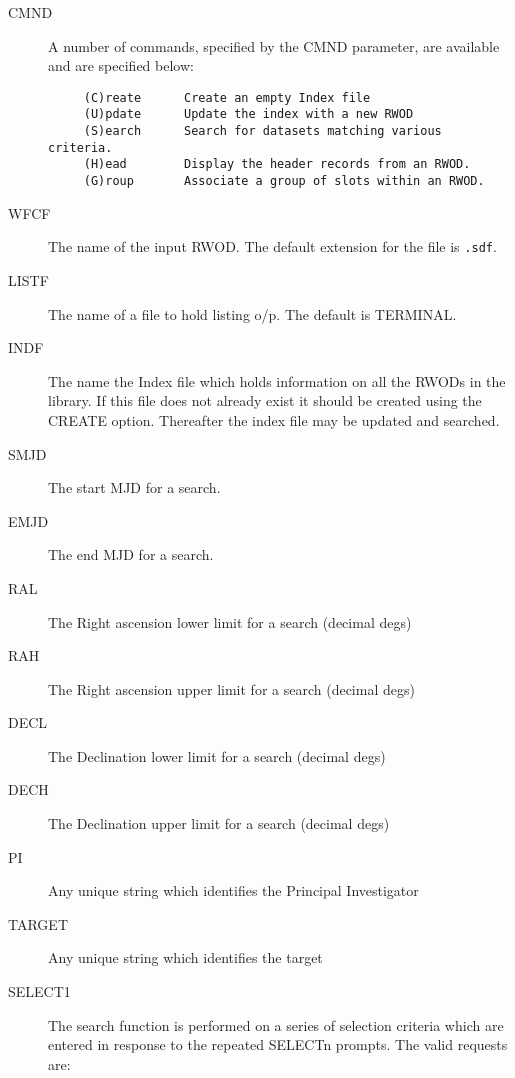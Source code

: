 \begin{description}

\item [CMND] 
A number of commands, specified by the CMND parameter, are
available and are specified below:

\begin{verbatim}
     (C)reate      Create an empty Index file
     (U)pdate      Update the index with a new RWOD
     (S)earch      Search for datasets matching various criteria.
     (H)ead        Display the header records from an RWOD.
     (G)roup       Associate a group of slots within an RWOD.
\end{verbatim}

\item[WFCF   ]
The name of the input RWOD. The default extension for the file is {\tt .sdf}.

\item[LISTF   ]
The name of a file to hold listing o/p. The default is TERMINAL.

\item[INDF   ]
The name the Index file which holds information on all the RWODs
in the library. If this file does not already exist it should be created 
using the CREATE option. Thereafter the index file may be 
updated and searched.

\item[SMJD   ]
The start MJD for a search.

\item[EMJD   ]
The end MJD for a search.

\item[RAL    ]
The Right ascension lower limit for a search (decimal degs)

\item[RAH    ]
The Right ascension upper limit for a search (decimal degs)

\item[DECL   ]
The Declination lower limit for a search (decimal degs)

\item[DECH   ]
The Declination upper limit for a search (decimal degs)

\item[PI   ]
Any unique string which identifies the Principal Investigator

\item[TARGET   ]
Any unique string which identifies the target

\item[SELECT1]
The search function is performed on a series of selection criteria
which are entered in response to the repeated SELECTn prompts. The valid 
requests are:


\end{description}
